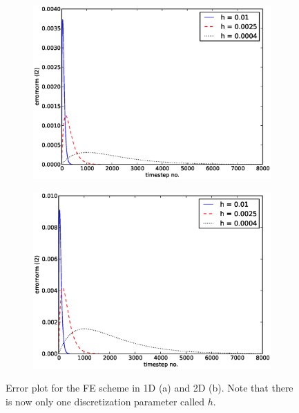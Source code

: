\begin{figure}[H]
 \centering
 \begin{subfigure}{0.49\textwidth}
  \includegraphics[width=\textwidth]{../results/experiment_22052014_1327_FE1D_new_plots/results/errorplot.eps}
  \caption{}
 \end{subfigure}
 \begin{subfigure}{0.49\textwidth}
  \includegraphics[width=\textwidth]{../results/experiment_22052014_1323_FE2D_new_plots/results/errorplot.eps}
  \caption{}
 \end{subfigure}
 \caption[Error plots FE]{Error plot for the FE scheme in 1D (a) and 2D (b). Note that there is now only one discretization parameter called $h$.}
 \label{analysis:errorplots:FE}
\end{figure}


